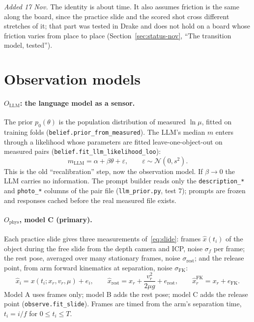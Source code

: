 \documentclass[10pt]{article}
\newcommand{\code}[1]{\texttt{#1}}
\begin{document}
\emph{Added 17 Nov.}  The identity is about time.  It also assumes friction is the same along the board, since the
practice slide and the scored shot cross different stretches of it; that part was tested in Drake and does not hold on a
board whose friction varies from place to place (Section~\ref{sec:status-nov}, ``The transition model, tested'').

\section{Observation models}
\label{sec:observation}
\paragraph{$O_{\text{LLM}}$: the language model as a sensor.}  The prior $p_0(\theta)$ is the population
distribution of measured $\ln\mu$, fitted on training folds (\code{belief.prior\_from\_measured}).  The LLM's
median $m$ enters through a likelihood whose parameters are fitted leave-one-object-out on measured pairs
(\code{belief.fit\_llm\_likelihood\_loo}):
\begin{equation}
m_{\text{LLM}}=\alpha+\beta\theta+\varepsilon,\qquad\varepsilon\sim\mathcal N(0,s^{2}).
\end{equation}
This is the old ``recalibration'' step, now the observation model.  If $\beta\to0$ the LLM carries no
information.  The prompt builder reads only the \code{description\_*} and \code{photo\_*} columns of the pair file
(\code{llm\_prior.py}, test 7); prompts are frozen and responses cached before the real measured file exists.

\paragraph{$O_{\text{phys}}$, model C (primary).}  Each practice slide gives three measurements of~\eqref{eq:slide}:
frames $\hat x(t_i)$ of the object during the free slide from the depth camera and ICP, noise $\sigma_f$ per frame;
the rest pose, averaged over many stationary frames, noise $\sigma_{\text{rest}}$; and the release point, from arm
forward kinematics at separation, noise $\sigma_{\text{FK}}$:
\begin{equation}
\hat x_i=x(t_i;x_r,v_r,\mu)+e_i,\qquad
\hat x_{\text{rest}}=x_r+\frac{v_r^{2}}{2\mu g}+e_{\text{rest}},\qquad
\hat x_r^{\text{FK}}=x_r+e_{\text{FK}} .
\end{equation}
Model A uses frames only; model B adds the rest pose; model C adds the release point
(\code{observe.fit\_slide}).  Frames are timed from the arm's separation time, $t_i=i/f$ for $0\le t_i\le T$.
\end{document}

